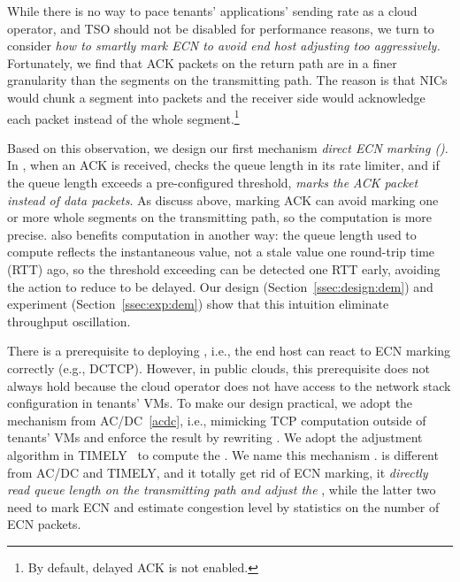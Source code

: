 While there is no way to pace tenants' applications' sending rate as a cloud operator, and TSO should not be disabled for performance reasons, we turn to consider \textit{how to smartly mark ECN to avoid end host adjusting \cwnd too aggressively.} Fortunately, we find that ACK packets on the return path are in a finer granularity than the segments on the transmitting path. The reason is that NICs would chunk a segment into packets and the receiver side would acknowledge each packet instead of the whole segment.\footnote{By default, delayed ACK is not enabled.} 

Based on this observation, we design our first mechanism \textemdash\xspace \textit{direct ECN marking (\nameone)}. In \nameone, when an ACK is received, \nameone checks the queue length in its rate limiter, and if the queue length exceeds a pre-configured threshold, \nameone \textit{marks the ACK packet instead of data packets}. As discuss above, marking ACK can avoid marking one or more whole segments on the transmitting path, so the \cwnd computation is more precise. \nameone also benefits \cwnd computation in another way: the queue length used to compute \cwnd reflects the instantaneous value, not a stale value one round-trip time (RTT) ago, so the threshold exceeding can be detected one RTT early, avoiding the action to reduce \cwnd to be delayed. Our design (Section~\ref{ssec:design:dem}) and experiment (Section~\ref{ssec:exp:dem}) show that this intuition eliminate throughput oscillation.

There is a prerequisite to deploying \nameone, i.e., the end host can react to ECN marking correctly (e.g., DCTCP). However, in public clouds, this prerequisite does not always hold because the cloud operator does not have access to the network stack configuration in tenants' VMs. To make our design practical, we adopt the mechanism from AC/DC~\ref{acdc}, i.e., mimicking TCP \cwnd computation outside of tenants' VMs and enforce the result by rewriting \rwnd. We adopt the \cwnd adjustment algorithm in TIMELY~\cite{timely} to compute the \rwnd. We name this mechanism \nametwo. \nametwo is different from AC/DC and TIMELY, and it totally get rid of ECN marking, it \textit{directly read queue length on the transmitting path and adjust the \rwnd}, while the latter two need to mark ECN and estimate congestion level by statistics on the number of ECN packets.

